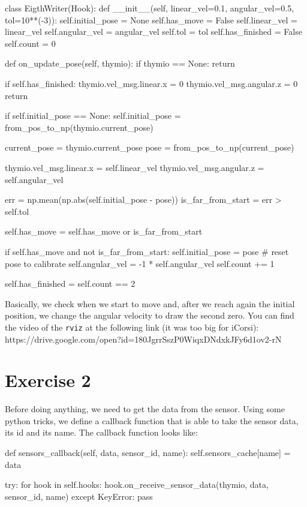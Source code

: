 \documentclass[11pt]{article}
\begin{document}
\begin{python}
class EigthWriter(Hook):
    def __init__(self, linear_vel=0.1, angular_vel=0.5, tol=10**(-3)):
        self.initial_pose = None
        self.has_move = False
        self.linear_vel = linear_vel
        self.angular_vel = angular_vel
        self.tol = tol
        self.has_finished = False
        self.count = 0

    def on_update_pose(self, thymio):
        if thymio == None: return

        if self.has_finished: 
            thymio.vel_msg.linear.x = 0
            thymio.vel_msg.angular.z = 0
            return
        
        if self.initial_pose == None: self.initial_pose = from_pos_to_np(thymio.current_pose)

        current_pose = thymio.current_pose
        pose = from_pos_to_np(current_pose)

        thymio.vel_msg.linear.x = self.linear_vel
        thymio.vel_msg.angular.z = self.angular_vel

        err = np.mean(np.abs(self.initial_pose - pose))
        is_far_from_start = err > self.tol 

        self.has_move = self.has_move or is_far_from_start

        if self.has_move and not is_far_from_start:
            self.initial_pose = pose # reset pose to calibrate
            self.angular_vel  = -1 * self.angular_vel
            self.count += 1
        
        self.has_finished =  self.count == 2
	
\end{python}
Basically, we check when we start to move and, after we reach again the initial position, we change the angular velocity to draw the second zero. You can find the video of the \texttt{rviz} at the following link (it was too big for iCorsi):
https://drive.google.com/open?id=180JgrrSszP0WiqxDNdxkJFy6d1ov2-rN
\section{Exercise 2}
Before doing anything, we need to get the data from the sensor. Using some python tricks, we define a callback function that is able to take the sensor data, its id and its name. The callback function looks like:

\begin{python}
 def sensors_callback(self, data, sensor_id, name):
        self.sensors_cache[name] = data

        try:
            for hook in self.hooks:
                hook.on_receive_sensor_data(thymio, data, sensor_id, name)
        except KeyError:
            pass	
\end{python}
\end{document}
